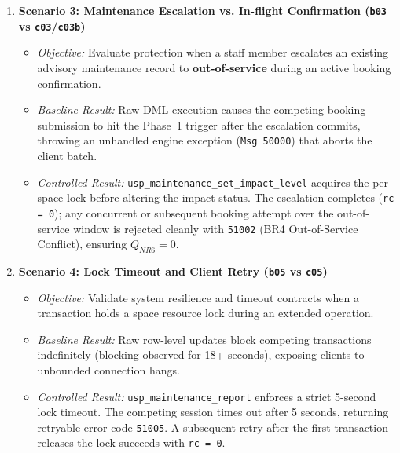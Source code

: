 \begin{enumerate}[leftmargin=*]
    \item \textbf{Scenario 3: Maintenance Escalation vs. In-flight Confirmation (\texttt{b03} vs \texttt{c03}/\texttt{c03b})}
    \begin{itemize}
        \item \emph{Objective:} Evaluate protection when a staff member escalates an existing advisory maintenance record to \textbf{out-of-service} during an active booking confirmation.
        \item \emph{Baseline Result:} Raw DML execution causes the competing booking submission to hit the Phase~1 trigger after the escalation commits, throwing an unhandled engine exception (\texttt{Msg 50000}) that aborts the client batch.
        \item \emph{Controlled Result:} \texttt{usp\_maintenance\_set\_impact\_level} acquires the per-space lock before altering the impact status. The escalation completes (\texttt{rc = 0}); any concurrent or subsequent booking attempt over the out-of-service window is rejected cleanly with \texttt{51002} (BR4 Out-of-Service Conflict), ensuring $Q_{NR6} = 0$.
    \end{itemize}

    \item \textbf{Scenario 4: Lock Timeout and Client Retry (\texttt{b05} vs \texttt{c05})}
    \begin{itemize}
        \item \emph{Objective:} Validate system resilience and timeout contracts when a transaction holds a space resource lock during an extended operation.
        \item \emph{Baseline Result:} Raw row-level updates block competing transactions indefinitely (blocking observed for 18+ seconds), exposing clients to unbounded connection hangs.
        \item \emph{Controlled Result:} \texttt{usp\_maintenance\_report} enforces a strict 5-second lock timeout. The competing session times out after 5 seconds, returning retryable error code \texttt{51005}. A subsequent retry after the first transaction releases the lock succeeds with \texttt{rc = 0}.
    \end{itemize}


\end{enumerate}
